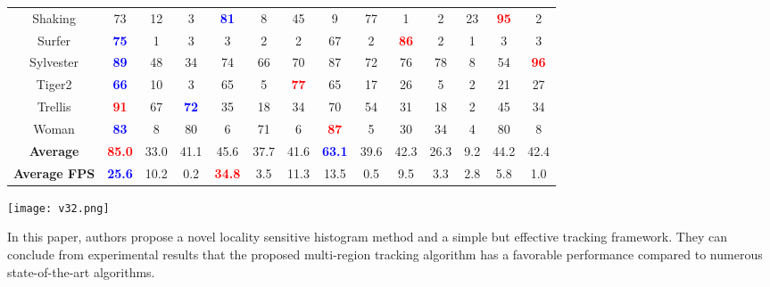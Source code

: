 \documentclass[10pt,twocolumn,letterpaper]{article}
\begin{document}
\begin{table*}
\begin{center}
\begin{tabular}{|c||c|c|c|c|c|c|c|c|c|c|c|c|c|}
  Shaking & 73 & 12 & 3 & \textcolor{blue}{\bf 81} & 8 & 45 & 9 & 77 & 1 & 2 & 23 & \textcolor{red}{\bf 95} & 2 \\
  Surfer & \textcolor{blue}{\bf 75} & 1 & 3 & 3 & 2 & 2 & 67 & 2 & \textcolor{red}{\bf 86} & 2 & 1 & 3 & 3 \\
  Sylvester & \textcolor{blue}{\bf 89} & 48 & 34 & 74 & 66 & 70 & 87 & 72 & 76 & 78 & 8 & 54 & \textcolor{red}{\bf 96} \\
  Tiger2 & \textcolor{blue}{\bf 66} & 10 & 3 & 65 & 5 & \textcolor{red}{\bf 77} & 65 & 17 & 26 & 5 & 2 & 21 & 27 \\
  Trellis & \textcolor{red}{\bf 91} & 67 & \textcolor{blue}{\bf 72} & 35 & 18 & 34 & 70 & 54 & 31 & 18 & 2 & 45 & 34 \\
  Woman & \textcolor{blue}{\bf 83} & 8 & 80 & 6 & 71 & 6 & \textcolor{red}{\bf 87} & 5 & 30 & 34 & 4 & 80 & 8 \\
  \hline
  {\bf Average} & \textcolor{red}{\bf 85.0} & 33.0 & 41.1 & 45.6 & 37.7 & 41.6 & \textcolor{blue}{\bf 63.1} & 39.6 & 42.3 & 26.3 & 9.2 & 44.2 & 42.4 \\
  \hline \hline
  {\bf Average FPS} & \textcolor{blue}{\bf 25.6} & 10.2 & 0.2 & \textcolor{red}{\bf 34.8} & 3.5 & 11.3 & 13.5 & 0.5 & 9.5 & 3.3 & 2.8 & 5.8 & 1.0 \\
  \hline
\end{tabular} 
\end{center}
\caption{The success rates (\%) and the average frames per second (FPS) of the 20 sequences. The best and the second best performing methods are shown in red color and blue color, respectively. The total number of frames is 10,918.}
\label{tab}
\end{table*}
\begin{figure*}
\begin{center}
\texttt{[image: v32.png]}
\end{center}
\caption{Screenshots of the visual tracking results. The figures are placed in the same order as Tab.~\ref{tab}. Red, green, yellow, azure, purple, olive and blue rectangles correspond to results from {\bf DFT}, {\bf CT}, {\bf MTT}, {\bf MIL}, {\bf Struck}, {\bf TLD} and {\bf ours}.}
\label{fig2}
\end{figure*}
\balance
In this paper, authors propose a novel locality sensitive histogram method and a simple but effective tracking framework. They can conclude from experimental results that the proposed multi-region tracking algorithm has a favorable performance compared to numerous state-of-the-art algorithms. 

{\small


}
\end{document}
